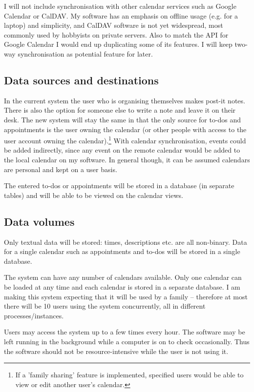 I will not include synchronisation with other calendar services such as Google
Calendar or CalDAV. My software has an emphasis on offline usage (e.g. for a
laptop) and simplicity, and CalDAV software is not yet widespread, most commonly
used by hobbyists on private servers. Also to match the API for Google Calendar
I would end up duplicating some of its features. I will keep two-way
synchronisation as potential feature for later.


\subsection{Data sources and destinations}

In the current system the user who is organising themselves makes post-it notes.
There is also the option for someone else to write a note and leave it on their
desk. The new system will stay the same in that the only source for to-dos and
appointments is the user owning the calendar (or other people with access to the
user account owning the calendar).\footnote{If a 'family sharing' feature is
implemented, specified users would be able to view or edit another user's
calendar.} With calendar synchronisation, events could be added indirectly,
since any event on the remote calendar would be added to the local calendar on
my software. In general though, it can be assumed calendars are personal and
kept on a user basis.

The entered to-dos or appointments will be stored in a database (in separate
tables) and will be able to be viewed on the calendar views.


\subsection{Data volumes}

Only textual data will be stored: times, descriptions etc. are all
non-binary. Data for a single calendar such as appointments and to-dos will be
stored in a single database.

The system can have any number of calendars available. Only one calendar can be
loaded at any time and each calendar is stored in a separate database. I am
making this system expecting that it will be used by a family -- therefore at
most there will be 10 users using the system concurrently, all in different
processes/instances.

Users may access the system up to a few times every hour. The software may be
left running in the background while a computer is on to check occasionally.
Thus the software should not be resource-intensive while the user is not using
it.



